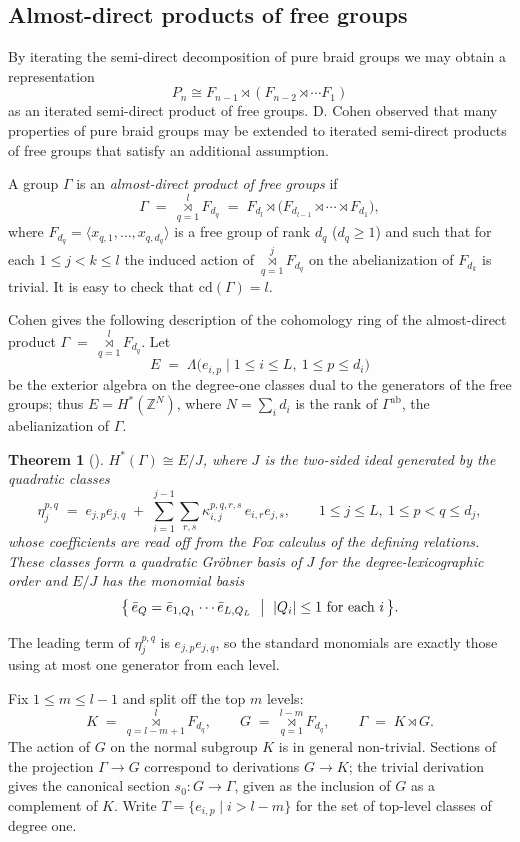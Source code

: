 \documentclass[11pt]{amsart}
\theoremstyle{plain}
\newtheorem{theorem}{Theorem}[section]
\theoremstyle{definition}
\newcommand{\HH}{H^{*}}
\newcommand{\Z}{\mathbb{Z}}
\newcommand{\cd}{\mathrm{cd}}
\newcommand{\bigrt}{\mathop{\rtimes}\limits}
\newcommand{\rt}{\rtimes}
\begin{document}
\subsection{Almost-direct products of free groups} By iterating the semi-direct decomposition of
pure braid groups we may obtain a representation
$$P_n\cong F_{n-1}\rtimes(F_{n-2}\rtimes\cdots F_1)$$
as an iterated semi-direct product of free groups. D. Cohen \cite{Cohen} observed that many 
properties of pure braid groups may be extended to iterated semi-direct products of free groups
that satisfy an additional assumption. 

A group $\Gamma$ is an \emph{almost-direct product of free groups} if
$$\Gamma \;=\; \bigrt_{q=1}^{l} F_{d_q}   \;=\; F_{d_l}\rt\bigl(F_{d_{l-1}}\rt\cdots\rt F_{d_1}\bigr), $$
where $F_{d_q}=\langle x_{q,1},\dots,x_{q,d_q}\rangle$ is a free group of rank $d_q$ ($d_q\ge 1$) and such that
for each $1\le j<k\le l$ the induced action of $\bigrt_{q=1}^{j} F_{d_q}$ on the abelianization of $F_{d_k}$
is trivial. It is easy to check that $\cd(\Gamma)=l$.

Cohen {\cite[Thm.~3.1, Cor.~2.5, Lem.~3.3, Rem.~3.4]{Cohen}} gives the following description of the 
cohomology ring of the almost-direct product $\Gamma \;=\; \bigrt_{q=1}^{l} F_{d_q} $.
Let
$$  E \;=\; \Lambda\bigl(e_{i,p}\mid 1\le i\le L,\ 1\le p\le d_i\bigr)$$
be the exterior algebra on the degree-one classes dual to the generators of the free groups; thus
$E=\HH(\Z^{N})$, where $N=\sum_i d_i$ is the rank of $\Gamma^{\mathrm{ab}}$, the abelianization of $\Gamma$. 

\begin{theorem}[]\label{thm:cohen}
$\HH(\Gamma)\cong E/J$, where $J$ is the two-sided ideal generated by the quadratic
classes
$$  \eta_j^{p,q}\;=\;
  e_{j,p}e_{j,q}\;+\;\sum_{i=1}^{j-1}\sum_{r,s}\kappa^{p,q,r,s}_{i,j}\,e_{i,r}e_{j,s},
  \qquad 1\le j\le L,\ 1\le p<q\le d_j,
$$
whose coefficients are read off from the Fox calculus of the defining relations.
These classes form a quadratic Gr\"obner basis of $J$ for the degree-lexicographic
order and $E/J$ has the monomial basis
$$  \bigl\{\,\bar e_{Q}=\bar e_{1,Q_1}\cdots\bar e_{L,Q_L}  \ \bigm|\ |Q_i|\le 1\ \text{for each } i\,\bigr\}.$$
\end{theorem}

The leading term of $\eta_j^{p,q}$ is $e_{j,p}e_{j,q}$, so the standard monomials are
exactly those using at most one generator from each level.
 
\medskip
Fix $1\le m\le l-1$ and split off the top $m$ levels:
$$  K \;=\; \bigrt_{q=l-m+1}^{l} F_{d_q},   \qquad
  G \;=\; \bigrt_{q=1}^{l-m} F_{d_q},   \qquad   \Gamma \;=\; K\rt G . $$
The action of $G$ on the normal subgroup $K$ is in general non-trivial. Sections of
the projection $\Gamma\to G$ correspond to derivations $G\to K$; the trivial derivation
gives the canonical section $s_0\colon G\longrightarrow \Gamma$, given as the inclusion of $G$ as 
a complement of $K$. Write 
$T=\{e_{i,p}\mid i>l-m\}$ for the set of top-level classes of degree one.
 
\end{document}
